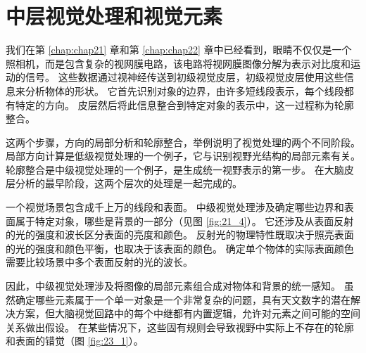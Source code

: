 \chapter{中层视觉处理和视觉元素} \label{chap:chap23}
我们在第 \ref{chap:chap21} 章和第 \ref{chap:chap22} 章中已经看到，眼睛不仅仅是一个照相机，而是包含复杂的视网膜电路，该电路将视网膜图像分解为表示对比度和运动的信号。 
这些数据通过视神经传送到初级视觉皮层，初级视觉皮层使用这些信息来分析物体的形状。 
它首先识别对象的边界，由许多短线段表示，每个线段都有特定的方向。 
皮层然后将此信息整合到特定对象的表示中，这一过程称为轮廓整合。


这两个步骤，方向的局部分析和轮廓整合，举例说明了视觉处理的两个不同阶段。 
局部方向计算是低级视觉处理的一个例子，它与识别视野光结构的局部元素有关。 
轮廓整合是中级视觉处理的一个例子，是生成统一视野表示的第一步。 
在大脑皮层分析的最早阶段，这两个层次的处理是一起完成的。


一个视觉场景包含成千上万的线段和表面。 
中级视觉处理涉及确定哪些边界和表面属于特定对象，哪些是背景的一部分（见图 \ref{fig:21_4}）。 
它还涉及从表面反射的光的强度和波长区分表面的亮度和颜色。 
反射光的物理特性既取决于照亮表面的光的强度和颜色平衡，也取决于该表面的颜色。 
确定单个物体的实际表面颜色需要比较场景中多个表面反射的光的波长。


因此，中级视觉处理涉及将图像的局部元素组合成对物体和背景的统一感知。 
虽然确定哪些元素属于一个单一对象是一个非常复杂的问题，具有天文数字的潜在解决方案，但大脑视觉回路中的每个中继都有内置逻辑，允许对元素之间可能的空间关系做出假设。
在某些情况下，这些固有规则会导致视野中实际上不存在的轮廓和表面的错觉（图 \ref{fig:23_1}）。


